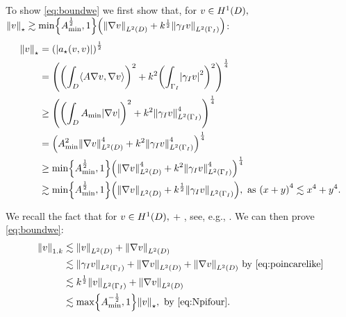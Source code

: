 To show \eqref{eq:boundwe} we first show that, for $v \in \HoD,$ $\Npi{v} \gtrsim \min\set{\Amin^{\half},1} \mleft(\NLtD{\grad v} + k^{\half} \NLtGI{\trGI v}\mright)$:
\begin{align}
  \Npi{v} &= \mleft(\abs{\api(v,v)}\mright)^{\half}\nonumber\\
          &= \mleft(\mleft(\int_D \IP{A \grad v}{\grad v}\mright)^2 + k^2 \mleft(\int_{\GI}\abs{\trGI v}^2\mright)^2\mright)^{\quarter}\nonumber\\
  &\geq \mleft(\mleft(\int_D \Amin \abs{\grad v}\mright)^2 + k^2 \NLtGI{\trGI v}^4\mright)^{\quarter}\nonumber\\
          &= \mleft(\Amin^2 \NLtD{\grad v}^4 + k^2 \NLtGI{\trGI v}^4\mright)^{\quarter}\nonumber\\
          &\geq \min\set{\Amin^{\half},1}\mleft(\NLtD{\grad v}^4 + k^2 \NLtGI{\trGI v}^4\mright)^{\quarter}\nonumber\\
  &\gtrsim \min\set{\Amin^{\half},1} \mleft(\NLtD{\grad v} + k^{\half} \NLtGI{\trGI v}\mright), \text{ as } \mleft(x+y\mright)^4 \lesssim x^4 + y^4.\label{eq:Npifour}
\end{align}

We recall the fact that for $v \in \HoD,$
\beq\label{eq:poincarelike}
 \lesssim {} + ,
\eeq
see, e.g., \cite[Equation (6.16)]{Sp:15}. We can then prove \eqref{eq:boundwe}:
\begin{align*}
   \NW{v} &\lesssim \NLtD{v}+ \NLtD{\grad v}\\
          &\lesssim \NLtGI{\trGI v}+ \NLtD{\grad v} + \NLtD{\grad v}\text{ by \eqref{eq:poincarelike}}\\
          &\lesssim k^{\half}\NLtGI{v} + \NLtD{\grad v}\\
  &\lesssim \max\set{\Amin^{-\half},1}\Npi{v}, \text{ by \eqref{eq:Npifour}.}
\end{align*}
\epf



